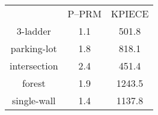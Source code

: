 \documentclass{article}
\begin{document}
\begin{tabular}{c c c}
&P--PRM&KPIECE\\
3-ladder&1.1&501.8\\
parking-lot&1.8&818.1\\
intersection&2.4&451.4\\
forest&1.9&1243.5\\
single-wall&1.4&1137.8\\
\end{tabular}
\end{document}
